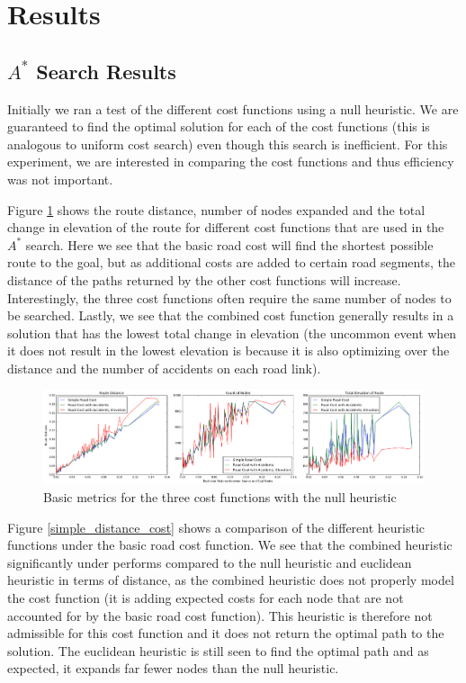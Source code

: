 \documentclass[11pt]{article}
\begin{document}
\section{Results}\label{results}

\subsection{$A^{*}$ Search Results}
Initially we ran a test of the different cost functions using a null heuristic. We are guaranteed to find the optimal solution for each of the cost functions (this is analogous to uniform cost search) even though this search is inefficient. For this experiment, we are interested in comparing the cost functions and thus efficiency was not important.
\par

Figure \ref{cost_comparison} shows the route distance, number of nodes expanded and the total change in elevation of the route for different cost functions that are used in the $A^{*}$ search. Here we see that the basic road cost will find the shortest possible route to the goal, but as additional costs are added to certain road segments, the distance of the paths returned by the other cost functions will increase. Interestingly, the three cost functions often require the same number of nodes to be searched. Lastly, we see that the combined cost function generally results in a solution that has the lowest total change in elevation (the uncommon event when it does not result in the lowest elevation is because it is also optimizing over the distance and the number of accidents on each road link).

\begin{figure}[H]
\includegraphics[width=1\textwidth]{../images/cost}
\caption{Basic metrics for the three cost functions with the null heuristic}
\label{cost_comparison}
\end{figure}

Figure \ref{simple_distance_cost} shows a comparison of the different heuristic functions under the basic road cost function. We see that the combined heuristic significantly under performs compared to the null heuristic and euclidean heuristic in terms of distance, as the combined heuristic does not properly model the cost function (it is adding expected costs for each node that are not accounted for by the basic road cost function). This heuristic is therefore not admissible for this cost function and it does not return the optimal path to the solution. The euclidean heuristic is still seen to find the optimal path and as expected, it expands far fewer nodes than the null heuristic.
\end{document}

